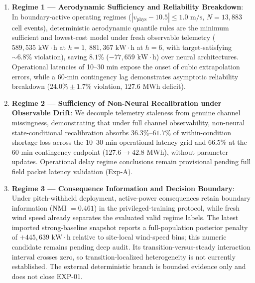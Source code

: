\documentclass[
  journal]{IEEEtran}
\makeatletter
\providecommand{\tightlist}{%
  \setlength{\itemsep}{0pt}\setlength{\parskip}{0pt}}
\def\section{\@startsection{section}{1}{\z@}{0.75ex plus 0.15ex minus 0.1ex}{0.25ex plus 0.08ex}{\normalfont\footnotesize\bfseries\centering\scshape}}
\makeatother
\begin{document}
\begin{enumerate}
\def\labelenumi{\arabic{enumi}.}
\tightlist
\item
  \textbf{Regime 1 --- Aerodynamic Sufficiency and Reliability
  Breakdown}: In boundary-active operating regimes
  (\(|v_{\text{phys}}-10.5|\le 1.0\text{ m/s}\), \(N=13{,}883\) cell
  events), deterministic aerodynamic quantile rules are the minimum
  sufficient and lowest-cost model under fresh observable telemetry
  (\(589{,}535\text{ kW}\cdot\text{h}\) at \(h=1\),
  \(881{,}367\text{ kW}\cdot\text{h}\) at \(h=6\), with
  target-satisfying \(\sim 6.8\%\) violation), saving \(8.1\%\)
  (\(-77{,}659\text{ kW}\cdot\text{h}\)) over neural architectures.
  Operational latencies of 10--30 min expose the onset of cubic
  extrapolation errors, while a 60-min contingency lag demonstrates
  asymptotic reliability breakdown (\(24.0\% \pm 1.7\%\) violation,
  \(127.6\text{ MWh}\) deficit).
\item
  \textbf{Regime 2 --- Sufficiency of Non-Neural Recalibration under
  Observable Drift}: We decouple telemetry staleness from genuine
  channel missingness, demonstrating that under full channel
  observability, non-neural state-conditional recalibration absorbs
  \(36.3\%\)--\(61.7\%\) of within-condition shortage loss across the
  \(10\)--\(30\) min operational latency grid and \(66.5\%\) at the
  \(60\)-min contingency endpoint (\(127.6 \to 42.8\text{ MWh}\)),
  without parameter updates. Operational delay regime conclusions remain
  provisional pending full field packet latency validation (Exp-A).
\item
  \textbf{Regime 3 --- Consequence Information and Decision Boundary}:
  Under pitch-withheld deployment, active-power consequences retain
  boundary information (NMI \(=0.461\)) in the privileged-training
  protocol, while fresh wind speed already separates the evaluated valid
  regime labels. The latest imported strong-baseline snapshot reports a
  full-population posterior penalty of
  \(+445{,}639\text{ kW}\cdot\text{h}\) relative to site-local
  wind-speed bins; this numeric candidate remains pending deep audit.
  Its transition-versus-steady interaction interval crosses zero, so
  transition-localized heterogeneity is not currently established. The
  external deterministic branch is bounded evidence only and does not
  close EXP-01.
\end{enumerate}

\section{Related Work}\label{related-work}
\end{document}
